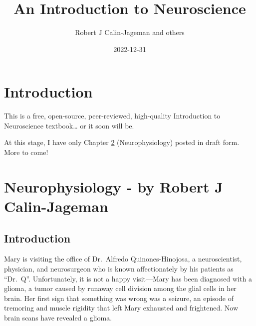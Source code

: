 \documentclass[
]{book}
\title{An Introduction to Neuroscience}
\author{Robert J Calin-Jageman and others}
\date{2022-12-31}
\begin{document}
\maketitle

{
\setcounter{tocdepth}{1}
\tableofcontents
}
\hypertarget{introduction}{%
\chapter{Introduction}\label{introduction}}

This is a free, open-source, peer-reviewed, high-quality Introduction to Neuroscience textbook\ldots{} or it soon will be.

At this stage, I have only Chapter \ref{neurophysiology} (Neurophysiology) posted in draft form. More to come!

\hypertarget{neurophysiology}{%
\chapter{Neurophysiology - by Robert J Calin-Jageman}\label{neurophysiology}}

\hypertarget{neurophysiology-introduction}{%
\section{Introduction}\label{neurophysiology-introduction}}

Mary is visiting the office of Dr.~Alfredo Quinones-Hinojosa, a neuroscientist, physician, and neurosurgeon who is known affectionately by his patients as ``Dr.~Q''. Unfortunately, it is not a happy visit---Mary has been diagnosed with a glioma, a tumor caused by runaway cell division among the glial cells in her brain. Her first sign that something was wrong was a seizure, an episode of tremoring and muscle rigidity that left Mary exhausted and frightened. Now brain scans have revealed a glioma.
\end{document}
